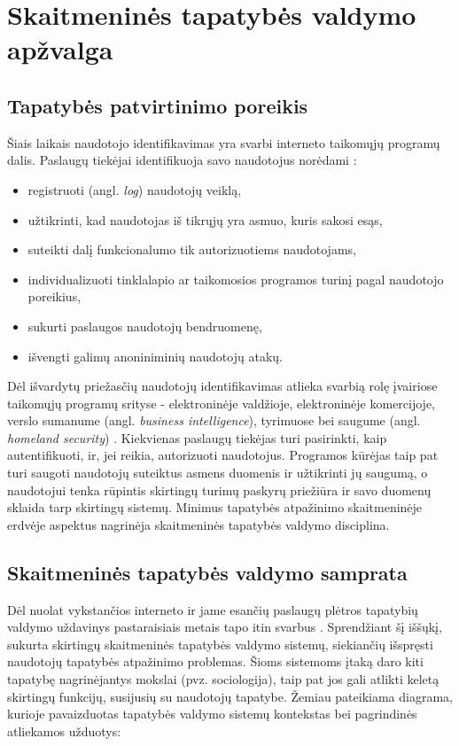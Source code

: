 \section{Skaitmeninės tapatybės valdymo apžvalga}

\subsection{Tapatybės patvirtinimo poreikis}

Šiais laikais naudotojo identifikavimas yra svarbi interneto taikomųjų
programų dalis. Paslaugų tiekėjai identifikuoja savo naudotojus norėdami \cite{RalucaBudiu2014}:

\begin{itemize}
    \item registruoti (angl. \textit{log}) naudotojų veiklą,
    \item užtikrinti, kad naudotojas iš tikrųjų yra asmuo, kuris sakosi esąs,
    \item suteikti dalį funkcionalumo tik autorizuotiems naudotojams,
    \item individualizuoti tinklalapio ar taikomosios programos turinį pagal naudotojo poreikius,
    \item sukurti paslaugos naudotojų bendruomenę,
    \item išvengti galimų anoniniminių naudotojų atakų.
\end{itemize}

Dėl išvardytų priežasčių naudotojų identifikavimas atlieka svarbią rolę įvairiose taikomųjų programų
srityse - elektroninėje valdžioje, elektroninėje komercijoje, verslo sumanume
(angl. \textit{business intelligence}), tyrimuose bei saugume
(angl. \textit{homeland security}) \cite{Glasser2009}. Kiekvienas paslaugų tiekėjas turi pasirinkti,
kaip autentifikuoti, ir, jei reikia, autorizuoti naudotojus. Programos kūrėjas taip pat turi saugoti
naudotojų suteiktus asmens duomenis ir užtikrinti jų saugumą, o naudotojui tenka rūpintis skirtingų turimų
paskyrų priežiūra ir savo duomenų sklaida tarp skirtingų sistemų. Minimus tapatybės atpažinimo
skaitmeninėje erdvėje aspektus nagrinėja skaitmeninės tapatybės valdymo disciplina.

\subsection{Skaitmeninės tapatybės valdymo samprata}

Dėl nuolat vykstančios interneto ir jame esančių paslaugų plėtros tapatybių
valdymo uždavinys pastaraisiais metais tapo itin svarbus \cite{Glasser2009}. Sprendžiant šį iššųkį,
sukurta skirtingų skaitmeninės tapatybės valdymo sistemų, siekiančių išspręsti naudotojų
tapatybės atpažinimo problemas. Šioms sistemoms įtaką daro
kiti tapatybę nagrinėjantys mokslai (pvz. sociologija), taip pat jos gali atlikti keletą skirtingų funkcijų, susijusių
su naudotojų tapatybe. Žemiau pateikiama diagrama,
kurioje pavaizduotas tapatybės valdymo sistemų kontekstas bei pagrindinės atliekamos užduotys:

